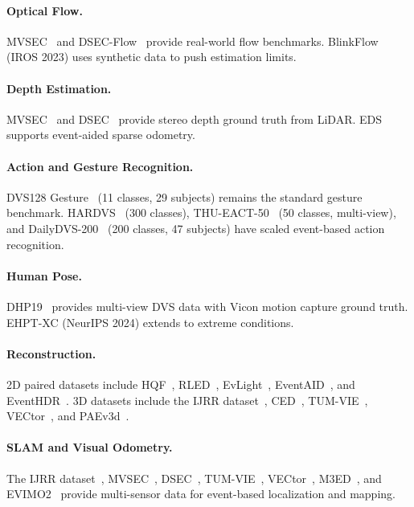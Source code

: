 \paragraph{Optical Flow.} MVSEC~\cite{zhu2018mvsec} and DSEC-Flow~\cite{gehrig2021dsec} provide real-world flow benchmarks. BlinkFlow~\cite{zhang2023blinkflow} (IROS 2023) uses synthetic data to push estimation limits.

\paragraph{Depth Estimation.} MVSEC~\cite{zhu2018mvsec} and DSEC~\cite{gehrig2021dsec} provide stereo depth ground truth from LiDAR. EDS~\cite{hidalgo2022eds} supports event-aided sparse odometry.

\paragraph{Action and Gesture Recognition.} DVS128 Gesture~\cite{amir2017dvs128gesture} (11 classes, 29 subjects) remains the standard gesture benchmark. HARDVS~\cite{wang2023hardvs} (300 classes), THU-EACT-50~\cite{gao2023thueact} (50 classes, multi-view), and DailyDVS-200~\cite{wang2024dailydvs200} (200 classes, 47 subjects) have scaled event-based action recognition.

\paragraph{Human Pose.} DHP19~\cite{calabrese2019dhp19} provides multi-view DVS data with Vicon motion capture ground truth. EHPT-XC (NeurIPS 2024) extends to extreme conditions.

\paragraph{Reconstruction.} 2D paired datasets include HQF~\cite{stoffregen2020hqf}, RLED~\cite{liu2024rled}, EvLight~\cite{liang2024evlight}, EventAID~\cite{cho2024eventaid}, and EventHDR~\cite{zou2025eventhdr}. 3D datasets include the IJRR dataset~\cite{mueggler2017ijrr}, CED~\cite{scheerlinck2019ced}, TUM-VIE~\cite{klenk2021tumvie}, VECtor~\cite{gao2022vector}, and PAEv3d~\cite{wang2024paev3d}.

\paragraph{SLAM and Visual Odometry.} The IJRR dataset~\cite{mueggler2017ijrr}, MVSEC~\cite{zhu2018mvsec}, DSEC~\cite{gehrig2021dsec}, TUM-VIE~\cite{klenk2021tumvie}, VECtor~\cite{gao2022vector}, M3ED~\cite{chaney2023m3ed}, and EVIMO2~\cite{burner2022evimo2} provide multi-sensor data for event-based localization and mapping.

